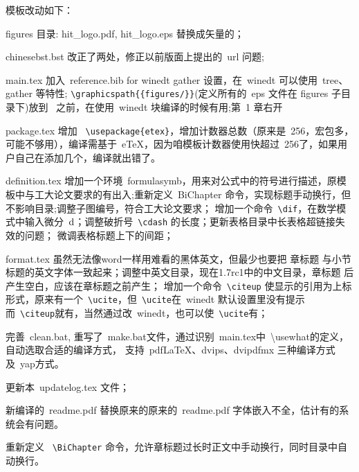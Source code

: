 模板改动如下：
\begin{hitlist}
    \item figures 目录: hit\_logo.pdf, hit\_logo.eps 替换成矢量的；
  \item chinesebst.bst 改正了两处，修正以前版面上提出的~url 问题;
  \item main.tex 加入~reference.bib for winedt gather 设置，在~winedt 可以使用~tree、gather 等特性;
    \verb|\graphicspath{{figures/}}|(定义所有的~eps 文件在 figures 子目录下)放到~\verb|| 之前，在使用~winedt 块编译的时候有用;第~1 章右开
  \item package.tex 增加 ~\verb|\usepackage{etex}|，增加计数器总数（原来是~256，宏包多，可能不够用），编译需基于~eTeX，因为咱模板计数器使用快超过~256了，如果用户自己在添加几个，编译就出错了。
  \item definition.tex 增加一个环境~formulasymb，用来对公式中的符号进行描述，原模板中与工大论文要求的有出入;重新定义~BiChapter 命令，实现标题手动换行，但不影响目录;调整子图编号，符合工大论文要求；
        增加一个命令~\verb|\dif|，在数学模式中输入微分~$\mathrm{d}$；调整破折号~\verb|\cdash| 的长度；更新表格目录中长表格超链接失效的问题；
        微调表格标题上下的间距；
  \item format.tex 虽然无法像word一样用难看的黑体英文，但最少也要把 章标题 与小节标题的英文字体一致起来；调整中英文目录，现在1.7rc1中的中文目录，章标题 后产生空白，应该在章标题之前产生；
       增加一个命令~\verb|\citeup| 使显示的引用为上标形式，原来有一个~\verb|\ucite|，但~\verb|\ucite|在~winedt 默认设置里没有提示
            而~\verb|\citeup|就有，当然通过改~winedt，也可以使~\verb|\ucite|有；
  \item 完善~clean.bat, 重写了~make.bat文件，通过识别~main.tex中~\textbackslash usewhat的定义，自动选取合适的编译方式，
       支持~pdfLaTeX、dvips、dvipdfmx 三种编译方式及~yap方式。
  \item 更新本~updatelog.tex 文件；
  \item 新编译的~readme.pdf 替换原来的原来的~readme.pdf 字体嵌入不全，估计有的系统会有问题。
  \item 重新定义 ~\verb"\BiChapter" 命令，允许章标题过长时正文中手动换行，同时目录中自动换行。
\end{hitlist}

